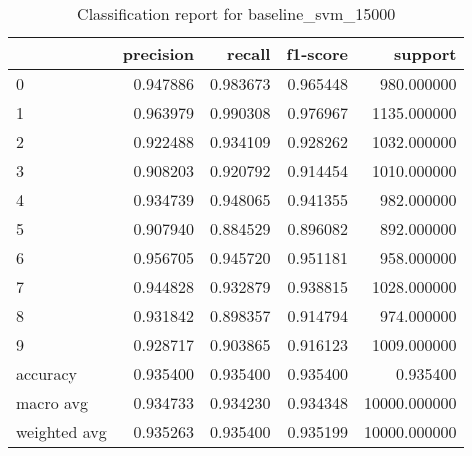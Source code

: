 \begin{table}[htb!]
\centering
\caption{Classification report for baseline_svm_15000}
\label{tab:classification-report-baseline_svm_15000}
\begin{tabular}{lrrrr}
\toprule
 & precision & recall & f1-score & support \\
\midrule
0 & 0.947886 & 0.983673 & 0.965448 & 980.000000 \\
1 & 0.963979 & 0.990308 & 0.976967 & 1135.000000 \\
2 & 0.922488 & 0.934109 & 0.928262 & 1032.000000 \\
3 & 0.908203 & 0.920792 & 0.914454 & 1010.000000 \\
4 & 0.934739 & 0.948065 & 0.941355 & 982.000000 \\
5 & 0.907940 & 0.884529 & 0.896082 & 892.000000 \\
6 & 0.956705 & 0.945720 & 0.951181 & 958.000000 \\
7 & 0.944828 & 0.932879 & 0.938815 & 1028.000000 \\
8 & 0.931842 & 0.898357 & 0.914794 & 974.000000 \\
9 & 0.928717 & 0.903865 & 0.916123 & 1009.000000 \\
accuracy & 0.935400 & 0.935400 & 0.935400 & 0.935400 \\
macro avg & 0.934733 & 0.934230 & 0.934348 & 10000.000000 \\
weighted avg & 0.935263 & 0.935400 & 0.935199 & 10000.000000 \\
\bottomrule
\end{tabular}
\end{table}
